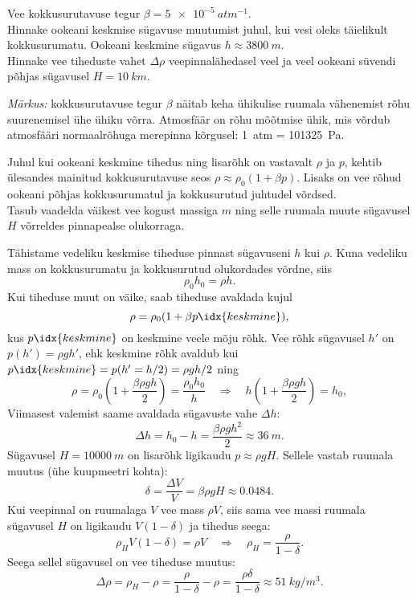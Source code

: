 
Vee kokkusurutavuse tegur $\beta = \SI{5e-5}{atm^{-1}}$.\\
\osa Hinnake ookeani keskmise sügavuse muutumist juhul, kui vesi oleks täielikult kokkusurumatu. Ookeani keskmine sügavus $h \approx \SI{3800}{m}$.\\
\osa Hinnake vee tiheduste vahet $\Delta \rho$ veepinnalähedasel veel ja veel ookeani süvendi põhjas sügavusel $H = \SI{10}{km}$. 

\emph{Märkus:} kokkusurutavuse tegur $\beta$ näitab keha ühikulise ruumala vähenemist rõhu suurenemisel ühe ühiku võrra. Atmosfäär on rõhu mõõtmise ühik, mis võrdub atmosfääri normaalrõhuga merepinna kõrgusel: \SI{1}{atm} = \SI{101325}{Pa}.

\hint
\osa Juhul kui ookeani keskmine tihedus ning lisarõhk on vastavalt $\rho$ ja $p$, kehtib ülesandes mainitud kokkusurutavuse seos $\rho \approx \rho_0 ( 1 + \beta p)$. Lisaks on vee rõhud ookeani põhjas kokkusurumatul ja kokkusurutud juhtudel võrdsed.\\
\osa Tasub vaadelda väikest vee kogust massiga $m$ ning selle ruumala muute sügavusel $H$ võrreldes pinnapealse olukorraga.

\solu
\osa Tähistame vedeliku keskmise tiheduse pinnast sügavuseni $h$ kui $\rho$. Kuna vedeliku mass on kokkusurumatu ja kokkusurutud olukordades võrdne, siis
\[
\rho_{0} h_{0}=\rho h.
\]
Kui tiheduse muut on väike, saab tiheduse avaldada kujul
\[
\rho = \rho_0 (1 + \beta p\idx{keskmine}),
\]
kus $p\idx{keskmine}$ on keskmine veele mõju rõhk. Vee rõhk sügavusel $h'$ on $p(h') = \rho gh'$, ehk keskmine rõhk avaldub kui $p\idx{keskmine} = p(h' = h/2) = \rho gh/2$ ning
\[
\rho=\rho_{0}\left(1+\frac{\beta \rho g h}{2}\right)=\frac{\rho_{0} h_{0}}{h} \quad \Rightarrow \quad h\left(1+\frac{\beta \rho g h}{2}\right)=h_{0},
\]
Viimasest valemist saame avaldada sügavuste vahe $\Delta h$:
\[
\Delta h=h_{0}-h=\frac{\beta \rho g h^{2}}{2} \approx \SI{36}{m}.
\]
\osa Sügavusel $H = \SI{10000}{m}$ on lisarõhk ligikaudu $p \approx \rho gH$. Sellele vastab ruumala muutus (ühe kuupmeetri kohta): 
\[
\delta=\frac{\Delta V}{V}=\beta \rho g H \approx \num{0,0484}.
\]
Kui veepinnal on ruumalaga $V$ vee mass $\rho V$, siis sama vee massi ruumala sügavusel $H$ on ligikaudu $V (1 - \delta )$ ja tihedus seega:
\[
\rho_{H} V(1-\delta)=\rho V \quad \Rightarrow \quad \rho_{H}=\frac{\rho}{1-\delta}.
\]
Seega sellel sügavusel on vee tiheduse muutus: 
\[
\Delta \rho=\rho_{H}-\rho=\frac{\rho}{1-\delta}-\rho=\frac{\rho \delta}{1-\delta} \approx \SI{51}{kg/m^3}.
\]
\probend